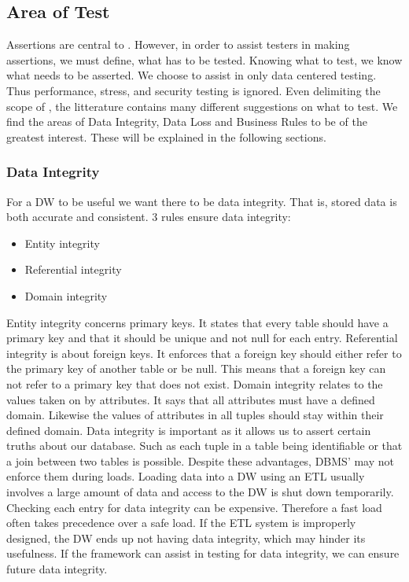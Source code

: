 \subsection{Area of Test}
Assertions are central to \FW{}. However, in order to assist testers in making assertions, we must define, what has to be tested. Knowing what to test, we know what needs to be asserted. We choose \FW{} to assist in only data centered testing. Thus performance, stress, and security testing is ignored.  Even delimiting the scope of \FW{}, the litterature contains many different suggestions on what to test. We find the areas of Data Integrity, Data Loss and Business Rules to be of the greatest interest. These will be explained in the following sections. 

\subsubsection{Data Integrity}
For a DW to be useful we want there to be data integrity. That is, stored data is both accurate and consistent. 3 rules ensure data integrity:

\begin{itemize}
\item Entity integrity
\item Referential integrity
\item Domain integrity
\end{itemize}

Entity integrity concerns primary keys. It states that every table should have a primary key and that it should be unique and not null for each entry. Referential integrity is about foreign keys. It enforces that a foreign key should either refer to the primary key of another table or be null. This means that a foreign key can not refer to a primary key that does not exist. Domain integrity relates to the values taken on by attributes. It says that all attributes must have a defined domain. Likewise the values of attributes in all tuples should stay within their defined domain. Data integrity is important as it allows us to assert certain truths about our database. Such as each tuple in a table being identifiable or that a join between two tables is possible. Despite these advantages, DBMS' may not enforce them during loads. Loading data into a DW using an ETL usually involves a large amount of data and access to the DW is shut down temporarily. Checking each entry for data integrity can be expensive. Therefore a fast load often takes precedence over a safe load. If the ETL system is improperly designed, the DW ends up not having data integrity, which may hinder its usefulness. If the framework can assist in testing for data integrity, we can ensure future data integrity.

